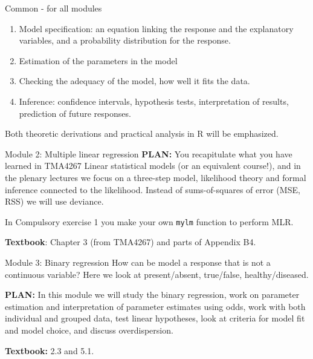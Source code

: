 \documentclass[
  ignorenonframetext,
]{beamer}
\begin{document}
\begin{frame}
\begin{block}{Common - for all modules}
\label{common---for-all-modules}
\begin{enumerate}
\item
  Model specification: an equation linking the response and the
  explanatory variables, and a probability distribution for the
  response.
\item
  Estimation of the parameters in the model
\item
  Checking the adequacy of the model, how well it fits the data.
\item
  Inference: confidence intervals, hypothesis tests, interpretation of
  results, prediction of future responses.
\end{enumerate}

Both theoretic derivations and practical analysis in R will be
emphasized.
\end{block}
\end{frame}

\begin{frame}[fragile]
\begin{block}{Module 2: Multiple linear regression}
\label{module-2-multiple-linear-regression}
\textbf{PLAN:} You recapitulate what you have learned in TMA4267 Linear
statistical models (or an equivalent course!), and in the plenary
lectures we focus on a three-step model, likelihood theory and formal
inference connected to the likelihood. Instead of sums-of-squares of
error (MSE, RSS) we will use deviance.

In Compulsory exercise 1 you make your own \texttt{mylm} function to
perform MLR.

\textbf{Textbook}: Chapter 3 (from TMA4267) and parts of Appendix B4.
\end{block}
\end{frame}

\begin{frame}
\begin{block}{Module 3: Binary regression}
\label{module-3-binary-regression}
How can be model a response that is not a continuous variable? Here we
look at present/absent, true/false, healthy/diseased.

\textbf{PLAN:} In this module we will study the binary regression, work
on parameter estimation and interpretation of parameter estimates using
odds, work with both individual and grouped data, test linear
hypotheses, look at criteria for model fit and model choice, and discuss
overdispersion.

\textbf{Textbook:} 2.3 and 5.1.
\end{block}
\end{frame}
\end{document}
